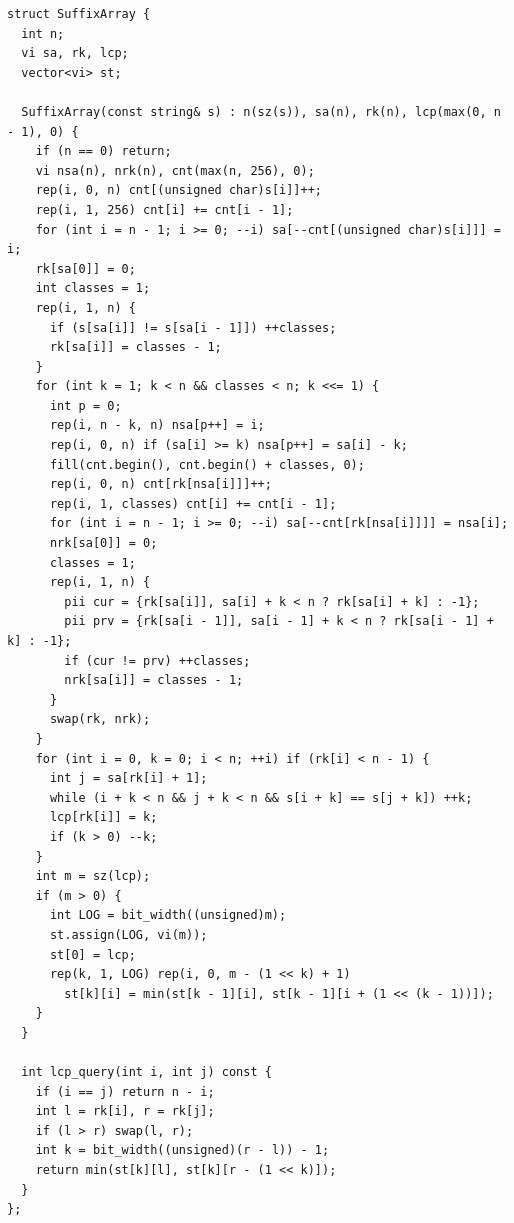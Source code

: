 \begin{lstlisting}
struct SuffixArray {
  int n;
  vi sa, rk, lcp;
  vector<vi> st;

  SuffixArray(const string& s) : n(sz(s)), sa(n), rk(n), lcp(max(0, n - 1), 0) {
    if (n == 0) return;
    vi nsa(n), nrk(n), cnt(max(n, 256), 0);
    rep(i, 0, n) cnt[(unsigned char)s[i]]++;
    rep(i, 1, 256) cnt[i] += cnt[i - 1];
    for (int i = n - 1; i >= 0; --i) sa[--cnt[(unsigned char)s[i]]] = i;
    rk[sa[0]] = 0;
    int classes = 1;
    rep(i, 1, n) {
      if (s[sa[i]] != s[sa[i - 1]]) ++classes;
      rk[sa[i]] = classes - 1;
    }
    for (int k = 1; k < n && classes < n; k <<= 1) {
      int p = 0;
      rep(i, n - k, n) nsa[p++] = i;
      rep(i, 0, n) if (sa[i] >= k) nsa[p++] = sa[i] - k;
      fill(cnt.begin(), cnt.begin() + classes, 0);
      rep(i, 0, n) cnt[rk[nsa[i]]]++;
      rep(i, 1, classes) cnt[i] += cnt[i - 1];
      for (int i = n - 1; i >= 0; --i) sa[--cnt[rk[nsa[i]]]] = nsa[i];
      nrk[sa[0]] = 0;
      classes = 1;
      rep(i, 1, n) {
        pii cur = {rk[sa[i]], sa[i] + k < n ? rk[sa[i] + k] : -1};
        pii prv = {rk[sa[i - 1]], sa[i - 1] + k < n ? rk[sa[i - 1] + k] : -1};
        if (cur != prv) ++classes;
        nrk[sa[i]] = classes - 1;
      }
      swap(rk, nrk);
    }
    for (int i = 0, k = 0; i < n; ++i) if (rk[i] < n - 1) {
      int j = sa[rk[i] + 1];
      while (i + k < n && j + k < n && s[i + k] == s[j + k]) ++k;
      lcp[rk[i]] = k;
      if (k > 0) --k;
    }
    int m = sz(lcp);
    if (m > 0) {
      int LOG = bit_width((unsigned)m);
      st.assign(LOG, vi(m));
      st[0] = lcp;
      rep(k, 1, LOG) rep(i, 0, m - (1 << k) + 1)
        st[k][i] = min(st[k - 1][i], st[k - 1][i + (1 << (k - 1))]);
    }
  }

  int lcp_query(int i, int j) const {
    if (i == j) return n - i;
    int l = rk[i], r = rk[j];
    if (l > r) swap(l, r);
    int k = bit_width((unsigned)(r - l)) - 1;
    return min(st[k][l], st[k][r - (1 << k)]);
  }
};
\end{lstlisting}

